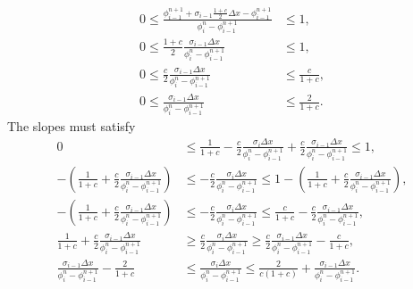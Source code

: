 \documentclass[../thesis.tex]{subfiles}
\begin{document}
\begin{equation}
    \label{eqn:slope-bounds}
    \begin{split}
        0
        \leq
        \frac{\phi_{i-1}^{n+1}
        +\sigma_{i-1}\frac{1+c}{2}\Delta x
        - \phi_{i-1}^{n+1}}{\phi_{i}^{n} - \phi_{i-1}^{n+1}}
        &\leq
        1,
        \\
        0
        \leq
        \frac{1+c}{2}
        \frac{\sigma_{i-1}\Delta x}
        {\phi_{i}^{n} - \phi_{i-1}^{n+1}}
        &\leq
        1,
        \\
        0
        \leq
        \frac{c}{2}
        \frac{\sigma_{i-1}\Delta x}
        {\phi_{i}^{n} - \phi_{i-1}^{n+1}}
        &\leq
        \frac{c}{1+c},
        \\
        0
        \leq
        \frac{\sigma_{i-1}\Delta x}
        {\phi_{i}^{n} - \phi_{i-1}^{n+1}}
        &\leq
        \frac{2}{1+c}.
    \end{split}
\end{equation}
The slopes must satisfy
\begin{equation}
    \label{eqn:slope-necessary}
    \begin{split}
        0
        &\leq
        \frac{1}{1+c}
        -\frac{c}{2}
        \frac{\sigma_{i}\Delta x}
        {\phi_{i}^{n} - \phi_{i-1}^{n+1}}
        +\frac{c}{2}
        \frac{\sigma_{i-1}\Delta x}
        {\phi_{i}^{n} - \phi_{i-1}^{n+1}}
        \leq
        1,
        \\
        -\left(\frac{1}{1+c}
        + \frac{c}{2}
        \frac{\sigma_{i-1}\Delta x}
        {\phi_{i}^{n} - \phi_{i-1}^{n+1}}\right)
        &\leq
        -\frac{c}{2}
        \frac{\sigma_{i}\Delta x}
        {\phi_{i}^{n} - \phi_{i-1}^{n+1}}
        \leq
        1-\left(\frac{1}{1+c}
        + \frac{c}{2}
        \frac{\sigma_{i-1}\Delta x}
        {\phi_{i}^{n} - \phi_{i-1}^{n+1}}\right),
        \\
        -\left(\frac{1}{1+c}
        + \frac{c}{2}
        \frac{\sigma_{i-1}\Delta x}
        {\phi_{i}^{n} - \phi_{i-1}^{n+1}}\right)
        &\leq
        -\frac{c}{2}
        \frac{\sigma_{i}\Delta x}
        {\phi_{i}^{n} - \phi_{i-1}^{n+1}}
        \leq
        \frac{c}{1+c}
        - \frac{c}{2}
        \frac{\sigma_{i-1}\Delta x}
        {\phi_{i}^{n} - \phi_{i-1}^{n+1}},
        \\
        \frac{1}{1+c}
        + \frac{c}{2}
        \frac{\sigma_{i-1}\Delta x}
        {\phi_{i}^{n} - \phi_{i-1}^{n+1}}
        &\geq
        \frac{c}{2}
        \frac{\sigma_{i}\Delta x}
        {\phi_{i}^{n} - \phi_{i-1}^{n+1}}
        \geq
        \frac{c}{2}
        \frac{\sigma_{i-1}\Delta x}
        {\phi_{i}^{n} - \phi_{i-1}^{n+1}}
        -\frac{c}{1+c},
        \\
        \frac{\sigma_{i-1}\Delta x}
        {\phi_{i}^{n} - \phi_{i-1}^{n+1}}
        -\frac{2}{1+c}
        &\leq
        \frac{\sigma_{i}\Delta x}
        {\phi_{i}^{n} - \phi_{i-1}^{n+1}}
        \leq
        \frac{2}{c(1+c)}
        + \frac{\sigma_{i-1}\Delta x}
        {\phi_{i}^{n} - \phi_{i-1}^{n+1}}.
    \end{split}
\end{equation}
\end{document}
